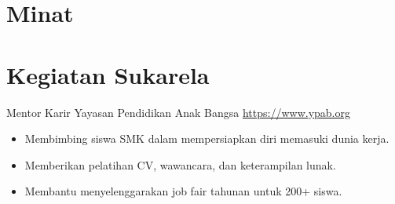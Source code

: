 \documentclass[a4paper, serif, 10pt]{moderncv}
\begin{document}
\section{Minat}

\section{Kegiatan Sukarela}

        {Mentor Karir}
        {Yayasan Pendidikan Anak Bangsa}
        {\url{https://www.ypab.org}}
        {}
        {\begin{itemize}
\item Membimbing siswa SMK dalam mempersiapkan diri memasuki dunia kerja.
\item Memberikan pelatihan CV, wawancara, dan keterampilan lunak.
\item Membantu menyelenggarakan job fair tahunan untuk 200+ siswa.
\end{itemize}}
    
\end{document}
